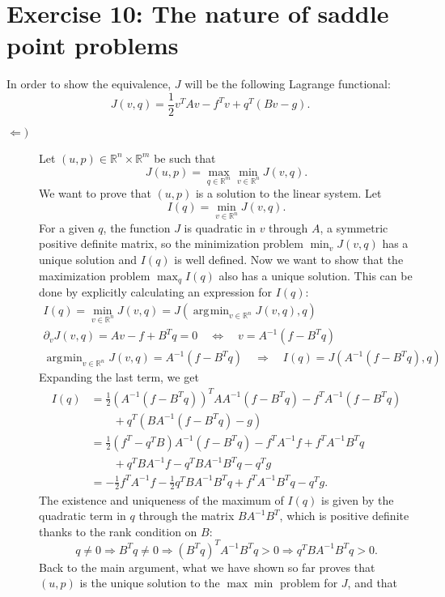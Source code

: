 \documentclass[a4paper]{article}
\DeclareMathOperator*{\argmin}{\arg\!\min}
\newcommand{\R}{\mathbb{R}}
\begin{document}
\section*{Exercise 10: The nature of saddle point problems}
In order to show the equivalence, $J$ will be the following Lagrange functional:
\[
J(v,q) = \frac{1}{2} v^T A v - f^T v + q^T (Bv-g).
\]
\begin{description}
\item[$\Leftarrow)$] Let $(u,p) \in \R^n \times \R^m$ be such that
	\[
	J(u,p) = \max_{q \in \R^m} \min_{v \in \R^n} J(v,q).
	\]
	We want to prove that $(u,p)$ is a solution to the linear system. Let
	\[
	I(q) = \min_{v \in \R^n} J(v,q).
	\]
	For a given $q$, the function $J$ is quadratic in $v$ through $A$, a symmetric
	positive definite matrix, so the minimization problem $\min_v J(v,q)$
	has a unique solution and $I(q)$ is well defined.
	Now we want to show that the maximization problem $\max_q I(q)$
	also has a unique solution. This can be done by explicitly
	calculating an expression for $I(q)$:
	\begin{gather*}
	I(q) = \min_{v \in \R^n} J(v,q) = J \left( \argmin_{v \in \R^n} J(v,q), q \right) \\
	\partial_v J (v,q) = Av - f + B^Tq = 0 \quad \Leftrightarrow \quad v = A^{-1}(f - B^Tq) \\
	\argmin_{v \in \R^n} J(v,q) = A^{-1}(f - B^Tq) \quad
	\Rightarrow \quad I(q) = J(A^{-1}(f - B^Tq),q)
	\end{gather*}
	Expanding the last term, we get
	\begin{align*}
	I(q) &= \frac{1}{2} (A^{-1}(f - B^Tq))^T A A^{-1}(f - B^Tq)- f^T A^{-1}(f - B^Tq) \\
&		\qquad + q^T(BA^{-1}(f - B^Tq)-g) \\
&	= \frac{1}{2} (f^T - q^TB) A^{-1} (f - B^Tq) - f^T A^{-1} f + f^T A^{-1} B^T q \\
&		\qquad + q^T BA^{-1} f - q^T BA^{-1}B^T q - q^T g \\
&	= -\frac{1}{2} f^T A^{-1} f -\frac{1}{2} q^T BA^{-1}B^T q + f^T A^{-1} B^T q - q^T g.
	\end{align*}
	The existence and uniqueness of the maximum of $I(q)$ is given by the quadratic
	term in $q$ through the matrix $BA^{-1}B^T$, which is positive definite thanks
	to the rank condition on $B$:
	\[
	q \neq 0
	\Rightarrow B^Tq \neq 0
	\Rightarrow (B^Tq)^T A^{-1} B^Tq > 0
	\Rightarrow q^T BA^{-1}B^T q > 0.
	\]
	Back to the main argument, what we have shown so far proves that $(u,p)$
	is the unique solution to the $\max\min$ problem for $J$, and that

\end{description}
\end{document}

